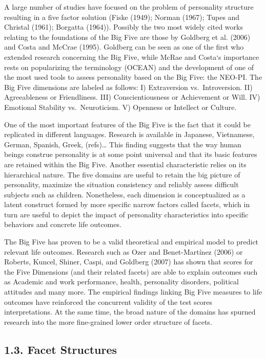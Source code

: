 \documentclass[,man,floatsintext]{apa6}
\theoremstyle{definition}
\theoremstyle{definition}
\theoremstyle{definition}
\theoremstyle{remark}
\begin{document}
A large number of studies have focused on the problem of personality
structure resulting in a five factor solution (Fiske (1949); Norman
(1967); Tupes and Christal (1961); Borgatta (1964)). Possibly the two
most widely cited works relating to the foundations of the Big Five are
those by Goldberg et al. (2006) and Costa and McCrae (1995). Goldberg
can be seen as one of the first who extended research concerning the Big
Five, while McRae and Costa`s importance rests on popularizing the
terminology (OCEAN) and the development of one of the most used tools to
assess personality based on the Big Five: the NEO-PI. The Big Five
dimensions are labeled as follows: I) Extraversion vs.~Introversion. II)
Agreeableness or Friendliness. III) Conscientiousness or Achievement or
Will. IV) Emotional Stability vs.~Neuroticism. V) Openness or Intellect
or Culture.

One of the most important features of the Big Five is the fact that it
could be replicated in different languages. Research is available in
Japanese, Vietnamese, German, Spanish, Greek, (refs)\ldots{} This
finding suggests that the way human beings construe personality is at
some point universal and that its basic features are retained within the
Big Five. Another essential characteristic relies on its hierarchical
nature. The five domains are useful to retain the big picture of
personality, maximize the situation consistency and reliably assess
difficult subjects such as children. Nonetheless, each dimension is
conceptualized as a latent construct formed by more specific narrow
factors called facets, which in turn are useful to depict the impact of
personality characteristics into specific behaviors and concrete life
outcomes.

The Big Five has proven to be a valid theoretical and empirical model to
predict relevant life outcomes. Research such as Ozer and Benet-Martínez
(2006) or Roberts, Kuncel, Shiner, Caspi, and Goldberg (2007) has shown
that scores for the Five Dimensions (and their related facets) are able
to explain outcomes such as Academic and work performance, health,
personality disorders, political attitudes and many more. The empirical
findings linking Big Five measures to life outcomes have reinforced the
concurrent validity of the test scores interpretations. At the same
time, the broad nature of the domains has spurned research into the more
fine-grained lower order structure of facets.

\hypertarget{facet-structures}{%
\subsection{1.3. Facet Structures}\label{facet-structures}}
\end{document}
